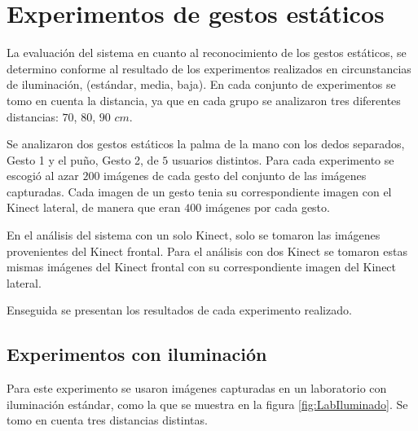 

\section{Experimentos de gestos estáticos}\label{TestStaticGestures}  

La evaluación del sistema en cuanto al reconocimiento de los gestos estáticos, se determino conforme al resultado de los experimentos realizados en circunstancias de iluminación, (estándar, media, baja). En cada conjunto de experimentos se tomo en cuenta la distancia, ya que en cada grupo se analizaron tres diferentes distancias: $70$, $80$, $90$ $cm$.  

Se analizaron dos gestos estáticos la palma de la mano con los dedos separados, Gesto 1 y el puño, Gesto 2, de $5$ usuarios distintos. Para cada experimento se escogió al azar $200$ imágenes de cada gesto del conjunto de las imágenes capturadas. Cada imagen de un gesto tenia su correspondiente imagen con el Kinect lateral, de manera que eran $400$ imágenes por cada gesto. 

En el análisis del sistema con un solo Kinect, solo se tomaron las imágenes provenientes del Kinect frontal. Para el análisis con dos Kinect se tomaron estas mismas imágenes del Kinect frontal con su correspondiente imagen del Kinect lateral.

Enseguida se presentan los resultados de cada experimento realizado.


\subsection{Experimentos con iluminación} 
Para este experimento se usaron imágenes capturadas en un laboratorio con iluminación estándar, como la que se muestra en la figura \ref{fig:LabIluminado}. Se tomo en cuenta tres distancias distintas. 

